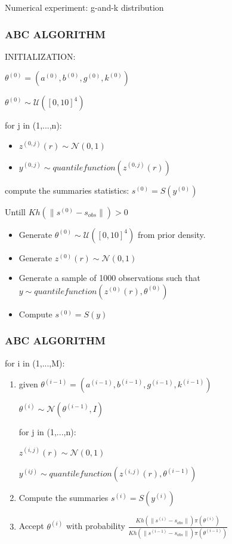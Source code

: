 \documentclass{beamer}
\begin{document}
\begin{section}{Numerical experiment: g-and-k distribution}
\begin{frame}
\end{frame}

\begin{frame}
	\frametitle{ABC ALGORITHM}
		
	INITIALIZATION:
	
	$\theta^{(0)}=(a^{(0)},b^{(0)},g^{(0)},k^{(0)})$
	
	$ \theta^{(0)} \sim \mathcal{U}([0,10]^{4})$
	
    for j in (1,...,n):
    
	\begin{itemize}
	\item $z^{(0,j)}(r) \sim \mathcal{N}(0,1)  $
	
	\item $ y^{(0,j)} \sim quantile function(z^{(0,j)}(r))$
\end{itemize}
	compute the summaries statistics:
	$ s^{(0)} =S(y^{(0)})$
	
	Untill $Kh(\|s^{(0)}-s_{obs}\|)>0$
	\begin{itemize}
	\item Generate $\theta^{(0)} \sim \mathcal{U}([0,10]^{4})$ from prior density.
	\item Generate $z^{(0)}(r) \sim \mathcal{N}(0,1)$
	\item Generate a sample of 1000 observations such that $y \sim quantile function(z^{(0)}(r),\theta^{(0)})$
	\item Compute $s^{(0)}=S(y)$
	\end{itemize}

\end{frame}

\begin{frame}
	\frametitle{ABC ALGORITHM}
	

	for i in (1,...,M):
	\begin{enumerate}
		\item given $\theta^{(i-1)}=(a^{(i-1)},b^{(i-1)},g^{(i-1)},k^{(i-1)})$
		
		$\theta^{(i)} \sim \mathcal{N}(\theta^{(i-1)},I)$
		
		for j in (1,...,n):
		
		$z^{(i,j)}(r) \sim \mathcal{N}(0,1)$
		
		$ y^{(ij)} \sim quantile function(z^{(i,j)}(r), \theta^{(i-1)})$
		
		
		\item Compute the summaries  $ s^{(i)} =S(y^{(i)})$
		
		\item Accept $\theta^{(i)}$ with probability $\frac{Kh(\|s^{(i)}-s_{obs}\|)\pi(\theta^{(i)})}{Kh(\|s^{(i-1)}-s_{obs}\|)\pi(\theta^{(i-1)})}$
		

\end{enumerate}
\end{frame}
\end{section}
\end{document}
